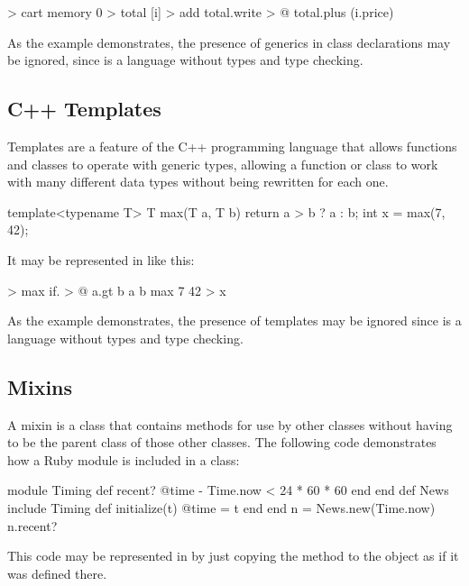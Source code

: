 \documentclass[sigplan,nonacm]{acmart}
\begin{document}
\begin{ffcode}
[] > cart
  memory 0 > total
  [i] > add
    total.write > @
      total.plus (i.price)
\end{ffcode}

As the example demonstrates, the presence of generics in class declarations may be ignored, since \eolang{} is a language without types and type checking.

\subsection{C++ Templates}
\label{sec:templates}

Templates are a feature of the C++ programming language that allows functions and classes to operate with generic types, allowing a function or class to work with many different data types without being rewritten for each one.

\begin{ffcode}
template<typename T> T max(T a, T b) {
  return a > b ? a : b;
}
int x = max(7, 42);
\end{ffcode}

It may be represented in \eolang{} like this:

\begin{ffcode}
[a b] > max
  if. > @
    a.gt b
    a
    b
max 7 42 > x
\end{ffcode}

As the example demonstrates, the presence of templates may be ignored since \eolang{} is a language without types and type checking.

\subsection{Mixins}
\label{sec:mixins}

A mixin is a class that contains methods for use by other classes without having to be the parent class of those other classes. The following code demonstrates how a Ruby module is included in a class:

\begin{ffcode}
module Timing
  def recent?
    @time - Time.now < 24 * 60 * 60
  end
end
def News
  include Timing
  def initialize(t)
    @time = t
  end
end
n = News.new(Time.now)
n.recent?
\end{ffcode}

This code may be represented in \eolang{} by just copying the method  to the object  as if it was defined there.
\end{document}
